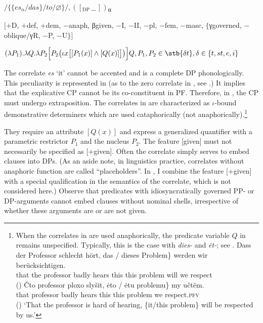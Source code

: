\documentclass[output=paper]{langscibook}
\begin{document}
\ea\label{ex:zimmermann:15}
    \ea\label{ex:zimmermann:15a}
    $/\big\{\{es_{\text{α}}/das\}/to/\varnothing\big\}/, ([_\textrm{DP} \, \_\_ \, ])$\textsubscript{α}

    \ex\label{ex:zimmermann:15b}
    $\lbrack+$D, $+$def, $+$dem, $-$anaph, βgiven, $-$I, $-$II, $-$pl, $-$fem, $-$masc, \newline $\lbrace$γgoverned, $-$oblique/γR, $-$P, $-$U$\rbrace\rbrack$

    \ex\label{ex:zimmermann:15c}
    $(\lambda P_1) . \lambda Q . \lambda P_2 \Big[P_2\big(\iota x \big[[P_1 (x)] \wedge [Q (x)]\big]\big)\Big] Q, P_1, P_2 \in \stb{\delta t}, {\delta} \in \{t, st, e, i\}$
\z\z

\noindent The correlate \textit{es} `it' cannot be accented and is a complete DP phonologically. This peculiarity is represented in  (as to the zero correlate in , see .) It implies that the explicative CP cannot be its co-constituent in PF. Therefore, in , the CP must undergo extraposition. The correlates in  are characterized as $\iota$-bound demonstrative determiners which are used cataphorically (not anaphorically).\footnote{When the correlates in  are used anaphorically, the predicate variable $Q$ in  remains unspecified. Typically, this is the case with  \textit{dies-} and  \textit{ėt-}; see .
        \ea\label{ex:zimmermann:fn20}
            \ea \gll Dass der Professor schlecht hört, \minsp{\{} das / dieses Problem\} werden wir berücksichtigen. \\
            that the professor badly hears {} this {} this problem will we respect\\ \hfill ()
            \ex \gll Čto professor ploxo slyšit, \minsp{\{} ėto / ėtu problemu\} my učtëm.\\
            that professor badly hears {} this {} this problem we respect.\textsc{pfv}\\ \hfill ()
            \z
            \glt `That the professor is hard of hearing, \{it/this problem\} will be respected by us.'
        \z}

They require an attribute $[Q (x)]$ and express a generalized quantifier with a parametric restrictor $P_1$ and the nucleus $P_2$. The feature [given] must not necessarily be specified as [$+$given]. Often the correlate simply serves to embed clauses into DPs. (As an aside note, in  linguistics practice, correlates without anaphoric function are called ``placeholders''. In \citet{Zimmermann2019c}, I combine the feature [$+$given] with a special qualification in the semantics of the correlate, which is not considered here.) Observe that predicates with idiosyncratically governed PP- or DP-arguments cannot embed clauses without nominal shells, irrespective of whether these arguments are or are not given.
\end{document}
